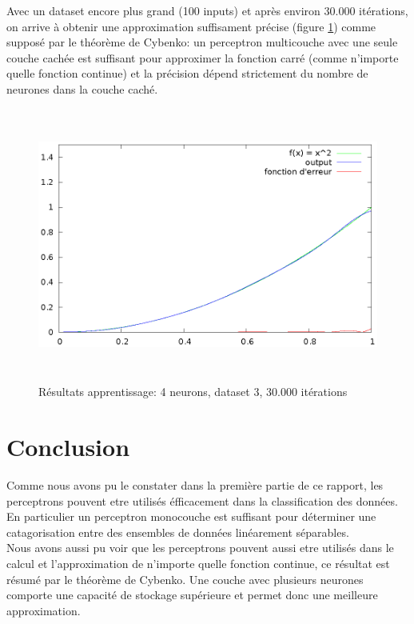 \documentclass[twoside,openright,a4paper,11pt,french]{article}
\begin{document}
Avec un dataset encore plus grand (100 inputs) et après environ
30.000 itérations, on arrive à obtenir une approximation suffisament
précise (figure \ref{fig:chartsqtest5}) comme supposé par le théorème de Cybenko:
un perceptron multicouche avec une seule couche cachée est suffisant pour
approximer la fonction carré (comme n'importe quelle fonction continue) 
et la précision dépend strictement du nombre de neurones dans la couche caché.

\begin{figure}[ht]
\centering
\includegraphics[width=12cm,height=9cm]{./pics/chartsqtest5.eps}
\caption{Résultats apprentissage: 4 neurons, dataset 3, 30.000 itérations}
\label{fig:chartsqtest5}
\end{figure}


\clearpage
\section{Conclusion}
Comme nous avons pu le constater dans la première partie de ce rapport, les
perceptrons pouvent etre utilisés éfficacement dans la classification des données.
En particulier un perceptron monocouche est suffisant pour déterminer une
catagorisation entre des ensembles de données linéarement séparables.\\

Nous avons aussi pu voir que les perceptrons pouvent aussi etre utilisés dans
le calcul et l'approximation de n'importe quelle fonction continue, ce résultat
est résumé par le théorème de Cybenko.  Une couche avec plusieurs neurones
comporte une capacité de stockage supérieure et permet donc une meilleure
approximation.\\
\end{document}
